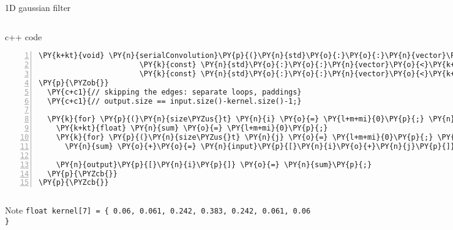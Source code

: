 \documentclass{beamer}
\begin{document}
\begin{frame}[fragile]{1D gaussian filter}

\begin{columns}[t]

\column{2.5in}

\begin{block}{c++ code}

\tiny
\begin{Verbatim}[commandchars=\\\{\},numbers=left,firstnumber=1,stepnumber=1]
\PY{k+kt}{void} \PY{n}{serialConvolution}\PY{p}{(}\PY{n}{std}\PY{o}{:}\PY{o}{:}\PY{n}{vector}\PY{o}{<}\PY{k+kt}{float}\PY{o}{>}\PY{o}{&} \PY{n}{output}\PY{p}{,}
                       \PY{k}{const} \PY{n}{std}\PY{o}{:}\PY{o}{:}\PY{n}{vector}\PY{o}{<}\PY{k+kt}{float}\PY{o}{>}\PY{o}{&} \PY{n}{input}\PY{p}{,}
                       \PY{k}{const} \PY{n}{std}\PY{o}{:}\PY{o}{:}\PY{n}{vector}\PY{o}{<}\PY{k+kt}{float}\PY{o}{>}\PY{o}{&} \PY{n}{kernel}\PY{p}{)}
\PY{p}{\PYZob{}}
  \PY{c+c1}{// skipping the edges: separate loops, paddings}
  \PY{c+c1}{// output.size == input.size()-kernel.size()-1;}

  \PY{k}{for} \PY{p}{(}\PY{n}{size\PYZus{}t} \PY{n}{i} \PY{o}{=} \PY{l+m+mi}{0}\PY{p}{;} \PY{n}{i} \PY{o}{<} \PY{n}{output}\PY{p}{.}\PY{n}{size}\PY{p}{(}\PY{p}{)}\PY{p}{;} \PY{n}{i}\PY{o}{+}\PY{o}{+}\PY{p}{)} \PY{p}{\PYZob{}}
    \PY{k+kt}{float} \PY{n}{sum} \PY{o}{=} \PY{l+m+mi}{0}\PY{p}{;}
    \PY{k}{for} \PY{p}{(}\PY{n}{size\PYZus{}t} \PY{n}{j} \PY{o}{=} \PY{l+m+mi}{0}\PY{p}{;} \PY{n}{j} \PY{o}{<}\PY{o}{=} \PY{n}{kernel}\PY{p}{.}\PY{n}{size}\PY{p}{(}\PY{p}{)}\PY{p}{;} \PY{n}{j}\PY{o}{+}\PY{o}{+}\PY{p}{)}
      \PY{n}{sum} \PY{o}{+}\PY{o}{=} \PY{n}{input}\PY{p}{[}\PY{n}{i}\PY{o}{+}\PY{n}{j}\PY{p}{]} \PY{o}{*} \PY{n}{kernel}\PY{p}{[}\PY{n}{j}\PY{p}{]}\PY{p}{;}

    \PY{n}{output}\PY{p}{[}\PY{n}{i}\PY{p}{]} \PY{o}{=} \PY{n}{sum}\PY{p}{;}
  \PY{p}{\PYZcb{}}
\PY{p}{\PYZcb{}}
\end{Verbatim}


\end{block}

\column{1.5in}

\texttt{[image: 1d\_gauss.png]} 

\end{columns}

\begin{exampleblock}{Note}
\tiny
\verb|float kernel[7] = { 0.06, 0.061, 0.242, 0.383, 0.242, 0.061, 0.06 }|
\end{exampleblock}

\end{frame}
\end{document}
